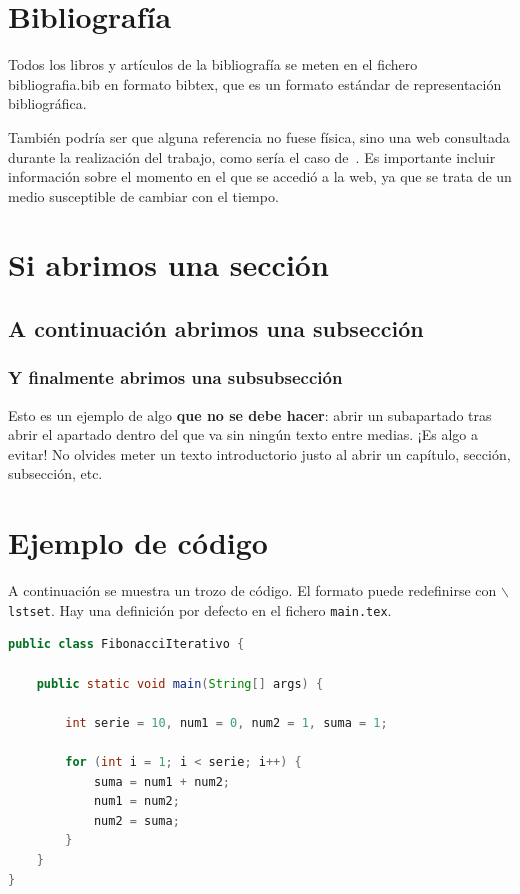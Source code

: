 \section{Bibliografía}

Todos los libros y artículos de la bibliografía se meten en el fichero bibliografia.bib en formato bibtex, que es un formato estándar de representación bibliográfica.


También podría ser que alguna referencia no fuese física, sino una web consultada durante la realización del trabajo, como sería el caso de~\cite{z80Decoding}. Es importante incluir información sobre el momento en el que se accedió a la web, ya que se trata de un medio susceptible de cambiar con el tiempo.

\section{Si abrimos una sección}

\subsection{A continuación abrimos una subsección}

\subsubsection{Y finalmente abrimos una subsubsección}

Esto es un ejemplo de algo \textbf{que no se debe hacer}: abrir un subapartado tras abrir el apartado dentro del que va sin ningún texto entre medias. ¡Es algo a evitar! No olvides meter un texto introductorio justo al abrir un capítulo, sección, subsección, etc.

\section{Ejemplo de código}

A continuación se muestra un trozo de código. El formato puede redefinirse con $\backslash$\texttt{lstset}. Hay una definición por defecto en el fichero \texttt{main.tex}.

\begin{lstlisting}[language = Java]
public class FibonacciIterativo {
 
    public static void main(String[] args) {
 
        int serie = 10, num1 = 0, num2 = 1, suma = 1;
         
        for (int i = 1; i < serie; i++) {
            suma = num1 + num2;
            num1 = num2;
            num2 = suma;
        }
    }
}
\end{lstlisting}

